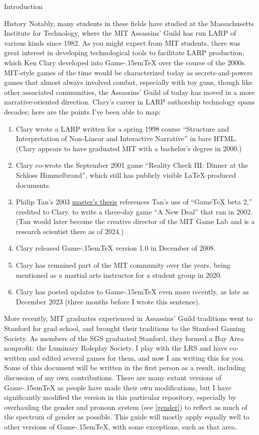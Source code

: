 \documentclass[11pt]{article}
\def\gametex{\mbox{Game\kern-.15em\TeX}}
\begin{document}
\begin{section}{Introduction}
\begin{subsection}{History}
Notably, many students in these fields have studied at the Massachusetts Institute for Technology, where the MIT Assassins' Guild has run LARP of various kinds since 1982.
As you might expect from MIT students, there was great interest in developing technological tools to facilitate LARP production, which Ken Clary developed into \gametex{} over the course of the 2000s.
MIT-style games of the time would be characterized today as secrets-and-powers games that almost always involved combat, especially with toy guns, though like other associated communities, the Assassins' Guild of today
has moved in a more narrative-oriented direction.
Clary's career in LARP authorship technology spans decades; here are the points I've been able to map:
\begin{enumerate}
\item Clary wrote a LARP written for a spring 1998 course ``Structure and Interpretation of Non-Linear and Interactive Narrative'' in bare HTML.  (Clary appears to have graduated MIT with a bachelor's degree in 2000.)
\item Clary co-wrote the September 2001 game  ``Reality Check III: Dinner at the Schloss Himmelbrand'', which still has publicly visible \LaTeX{}-produced documents.
\item Philip Tan's 2003 \href{https://drive.google.com/file/d/1RiGc2OWtXIPlebHVrixv2IpAbSGAThtd/view?usp=sharing}{master's thesis} references Tan's use of ``GameTeX beta 2,'' credited to Clary, to write a three-day game ``A New Deal'' that ran in 2002.  (Tan would later become the creative director of the MIT Game Lab and is a research scientist there as of 2024.)
\item Clary released \gametex{} version 1.0 in December of 2008.
\item Clary has remained part of the MIT community over the years, being mentioned as a martial arts instructor for a student group in 2020.
\item Clary has posted updates to \gametex{} even more recently, as late as December 2023 (three months before I wrote this sentence).
\end{enumerate}
More recently, MIT graduates experienced in Assassins' Guild traditions went to Stanford for grad school, and brought their traditions to the Stanford Gaming Society.  As members of the SGS graduated Stanford, 
they formed a Bay Area nonprofit: the Luminary Roleplay Society.  I play with the LRS and have co-written and edited several games for them, and now I am writing this for you.  Some of this document will be written in the first person as a result, including discussion of my own contributions.  There are many extant versions of \gametex{} as people have made their own modifications, but I have significantly modified the version in this particular repository, especially by overhauling the gender and pronoun system (see \ref{gender}) to reflect as much of the spectrum of gender as possible.  This guide will mostly apply equally well to other versions of \gametex{}, with some exceptions, such as that area.

\end{subsection}
\end{section}
\end{document}
